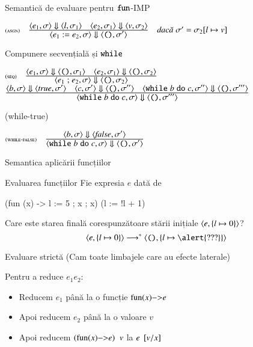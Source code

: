 \documentclass[xcolor=pdftex,romanian,colorlinks]{beamer}
\begin{document}
\begin{section}{Semantică de evaluare pentru $\mathrel{\text{\ttfamily fun}}$-IMP}
\begin{frame}
\begin{itemize}
\vitem[]
$\reg[asgn]{\S{\c{{e_1\mathrel{:=} e_2},\sigma}}{\c{\Sskip,\sigma'}}}{\S{\c{e_1,\sigma}}{\c{l,\sigma_1}} \si \S{\c{e_2,\sigma_1}}{\c{v,\sigma_2}}}{\sigma' = \sigma_2[ l \mapsto v]}$

\end{itemize}
\end{frame}

\begin{frame}
{Compunere secvențială și $\mathrel{\text{\ttfamily while}}$}

\vfill$\reg[seq]{\S{\c{e_1\mathrel{;} e_2,\sigma}}{\c{\Sskip,\sigma_2}}}{\S{\c{e_1,\sigma}}{\c{\Sskip, \sigma_1}}\si \S{\c{e_2,\sigma_1}}{\c{\Sskip, \sigma_2}}}{}$
\vfill
$\reg{\S{\c{\Swhile b \Sdo c,\sigma}}{\c{\Sskip,\sigma'''}}}{\S{\c{b,\sigma}}{\c{\Strue, \sigma'}}\si \S{\c{c,\sigma'}}{\c{\Sskip, \sigma''}}\si \S{\c{\Swhile b \Sdo c,\sigma''}}{\c{\Sskip,\sigma'''}}}{}$

\hfill ({\sc while-true})

\vfill
$\reg[while-false]{\S{\c{\Swhile b \Sdo c,\sigma}}{\c{\Sskip,\sigma'}}}{\S{\c{b,\sigma}}{\c{\Sfalse, \sigma'}}}{}$

\vfill

\end{frame}

\begin{subsection}{Semantica aplicării funcțiilor}

\begin{frame}[fragile]{Evaluarea funcțiilor}
Fie expresia $e$ dată de 
\begin{asciiml}
(fun (x) -> l := 5 ; x ; x) (l := !l + 1)
\end{asciiml}

Care este starea finală corespunzătoare stării inițiale ${\langle{e,\{l\mapsto 0\}}\rangle}$?
\[\c{e,\{l\mapsto 0\}} \longrightarrow^\ast \c{\Sskip, \{l\mapsto \alert{???}\}}\]

\end{frame}



\begin{frame}{Evaluare strictă (Cam toate limbajele care au efecte laterale)}
\begin{block}{}
Pentru a reduce $e_1 \mathrel{} e_2$:
\begin{itemize}
\item  Reducem $e_1$ până la o funcție
$\fun{x}{e}$
\item Apoi reducem $e_2$ până la o valoare $v$
\item Apoi reducem $(\fun{x}{e})\mathrel{}v$ la $e\mathbin{}[v/x]$
\end{itemize}
\end{block}


\end{frame}
\end{subsection}
\end{section}
\end{document}
